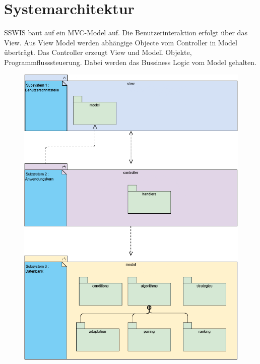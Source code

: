 \section{Systemarchitektur}

SSWIS baut auf ein MVC-Model auf. Die Benutzerinteraktion erfolgt
über das View. Aus View Model werden abhängige Objecte vom Controller in Model überträgt. Das Controller erzeugt View und Modell Objekte, Programmflusssteuerung. Dabei werden das Bussiness Logic vom Model gehalten.

\begin{figure} 
  \centering
     \includegraphics[width=1.1\textwidth]{Systemarchitektur/UMLzuGrobentwurf.png}
\end{figure}

